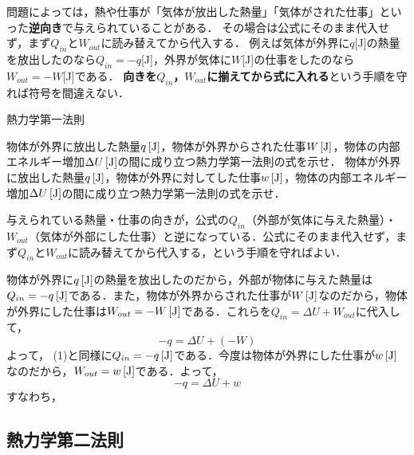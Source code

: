 問題によっては，熱や仕事が「気体が放出した熱量」「気体がされた仕事」といった{\bf 逆向き}で与えられていることがある．
その場合は公式にそのまま代入せず，まず$Q_{in}$と$W_{out}$に読み替えてから代入する．
例えば気体が外界に$q$[J]の熱量を放出したのなら$Q_{in}=-q$[J]，外界が気体に$W$[J]の仕事をしたのなら$W_{out}=-W$[J]である．
{\bf 向きを$Q_{in}$，$W_{out}$に揃えてから式に入れる}という手順を守れば符号を間違えない．
\begin{reidaiunit}
\begin{reidai}{熱力学第一法則}
\begin{komon}
 物体が外界に放出した熱量$q\,[\mathrm{J}]$，物体が外界からされた仕事$W\,[\mathrm{J}]$，物体の内部エネルギー増加$\Delta U\,[\mathrm{J}]$の間に成り立つ熱力学第一法則の式を示せ．
 物体が外界に放出した熱量$q\,[\mathrm{J}]$，物体が外界に対してした仕事$w\,[\mathrm{J}]$，物体の内部エネルギー増加$\Delta U\,[\mathrm{J}]$の間に成り立つ熱力学第一法則の式を示せ．
\end{komon}
\end{reidai}

\begin{sisinE}
与えられている熱量・仕事の向きが，公式の$Q_{in}$（外部が気体に与えた熱量）・$W_{out}$（気体が外部にした仕事）と逆になっている．公式にそのまま代入せず，まず$Q_{in}$と$W_{out}$に読み替えてから代入する，という手順を守ればよい．
\end{sisinE}


\begin{kaitou}
\begin{komon}
 物体が外界に$q\,[\mathrm{J}]$の熱量を放出したのだから，外部が物体に与えた熱量は$Q_{in}=-q\,[\mathrm{J}]$である．また，物体が外界からされた仕事が$W\,[\mathrm{J}]$なのだから，物体が外界にした仕事は$W_{out}=-W\,[\mathrm{J}]$である．これらを$Q_{in}=\Delta U+W_{out}$に代入して，
       \[-q=\Delta U+(-W)\]
       よって，
 (1)と同様に$Q_{in}=-q\,[\mathrm{J}]$である．今度は物体が外界にした仕事が$w\,[\mathrm{J}]$なのだから，$W_{out}=w\,[\mathrm{J}]$である．よって，
       \[-q=\Delta U+w\]
       すなわち，
\end{komon}
\end{kaitou}
\end{reidaiunit}






\subsection{熱力学第二法則}

